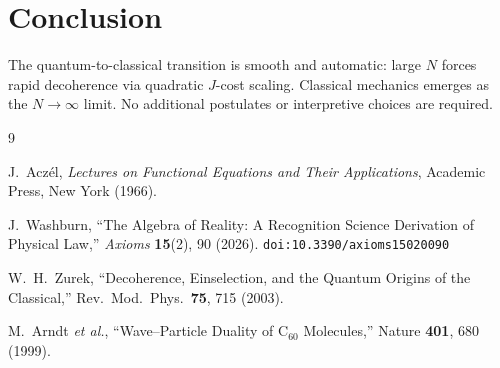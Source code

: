 \documentclass[12pt,a4paper]{article}
\theoremstyle{definition}
\theoremstyle{remark}
\begin{document}
\section{Conclusion}

The quantum-to-classical transition is smooth and automatic:
large $N$ forces rapid decoherence via quadratic $J$-cost scaling.
Classical mechanics emerges as the $N \to \infty$ limit.  No
additional postulates or interpretive choices are required.

\begin{thebibliography}{9}

J.~Acz\'el, \emph{Lectures on Functional Equations and Their Applications},
Academic Press, New York (1966).

J.~Washburn, ``The Algebra of Reality: A Recognition Science Derivation
of Physical Law,'' \emph{Axioms} \textbf{15}(2), 90 (2026).
\texttt{doi:10.3390/axioms15020090}

W.~H.~Zurek, ``Decoherence, Einselection, and the Quantum
Origins of the Classical,'' Rev.\ Mod.\ Phys.\ \textbf{75},
715 (2003).

M.~Arndt \emph{et al.}, ``Wave--Particle Duality of
C$_{60}$ Molecules,'' Nature \textbf{401}, 680 (1999).
\end{thebibliography}
\end{document}
